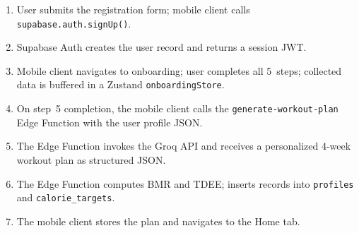 \begin{enumerate}
	\item User submits the registration form; mobile client calls
	\texttt{supabase.auth.signUp()}.
	\item Supabase Auth creates the user record and returns a session JWT.
	\item Mobile client navigates to onboarding; user completes all
	5~steps; collected data is buffered in a Zustand
	\texttt{onboardingStore}.
	\item On step~5 completion, the mobile client calls the
	\texttt{generate-workout-plan} Edge Function with the user profile
	JSON.
	\item The Edge Function invokes the Groq API and receives a
	personalized 4-week workout plan as structured JSON.
	\item The Edge Function computes BMR and TDEE; inserts records into
	\texttt{profiles} and \texttt{calorie\_targets}.
	\item The mobile client stores the plan and navigates to the Home tab.
\end{enumerate}

